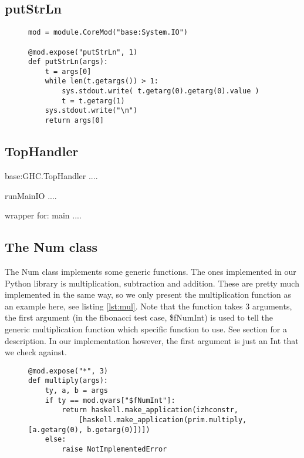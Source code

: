  

\subsection{putStrLn}


\begin{figure}[H]
\lstset{ %
language=Python,
caption=Implementation of the putStrLn function.,
label=lst:put
}

\begin{lstlisting}
mod = module.CoreMod("base:System.IO")

@mod.expose("putStrLn", 1)
def putStrLn(args):
    t = args[0]
    while len(t.getargs()) > 1:
        sys.stdout.write( t.getarg(0).getarg(0).value )
        t = t.getarg(1)
    sys.stdout.write("\n")
    return args[0]
\end{lstlisting}
\end{figure}




\subsection{TopHandler}

base:GHC.TopHandler ....

runMainIO ....

wrapper for:
main ....

\subsection{The Num class}

The Num class implements some generic functions. The ones implemented
in our Python library is multiplication, subtraction and addition. These
are pretty much implemented in the same way, so we only present the
multiplication function as an example here, see listing \ref{lst:mul}.
Note that the function takes 3 arguments, the first argument 
(in the fibonacci test case, \$fNumInt) is used to tell the
generic multiplication function which specific function to use.
See section \label{subsec:classes} for a description. In our 
implementation however, the first argument is just an Int that we 
check against.

\begin{figure}[H]
\lstset{ %
language=Python,
caption=Implementation of the generic multiplication function.,
label=lst:mul
}

\begin{lstlisting}
@mod.expose("*", 3)
def multiply(args):
    ty, a, b = args
    if ty == mod.qvars["$fNumInt"]:
        return haskell.make_application(izhconstr,
            [haskell.make_application(prim.multiply, [a.getarg(0), b.getarg(0)])])
    else:
        raise NotImplementedError
\end{lstlisting}
\end{figure}


